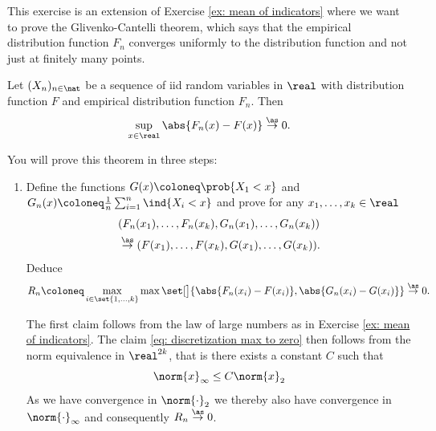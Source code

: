 \begin{exercise}
    This exercise is an extension of Exercise \ref{ex: mean of indicators} where
    we want to prove the Glivenko-Cantelli theorem, which says that the
    empirical distribution function \(F_n\) converges uniformly to the
    distribution function and not just at finitely many points.
    \begin{mdframed}[innertopmargin=0pt]
    \begin{theorem}
        \label{thm: glivenko cantelli}
        Let \((X_n)_{n\in \nat}\) be a sequence of iid random
        variables in \(\real\) with distribution function \(F\) and empirical 
        distribution function \(F_n\). Then
        \[
            \sup_{x\in \real}\abs{F_n(x) - F(x)} \overset{\as}\to 0.
        \]
    \end{theorem}
    \end{mdframed}
    You will prove this theorem in three steps:
    \begin{enumerate}[label=(\alph*),noitemsep]
        \item Define the functions \(G(x) \coloneq \prob{X_1 < x}\) and \(G_n(x) \coloneq \frac1n \sum_{i=1}^n \ind{X_i < x}\)
        and prove for any \(x_1, \dots, x_k \in \real\)
        \[\begin{aligned}
            &(F_n(x_1), \dots, F_n(x_k), G_n(x_1), \dots, G_n(x_k))
            \\
            &\overset{\as}\to (F(x_1), \dots, F(x_k), G(x_1), \dots, G(x_k)).
        \end{aligned}
        \]
        Deduce
        \begin{equation}
            \label{eq: discretization max to zero}            
            R_n \coloneq \max_{i\in \set{1,\dots, k}} \max\set[\big]{\abs{F_n(x_i) - F(x_i)}, \abs{G_n(x_i) - G(x_i)}} \overset{\as}\to 0.
        \end{equation}
        \begin{solution}
            The first claim follows from the law of large numbers as in Exercise \ref{ex: mean of indicators}.
            The claim \eqref{eq: discretization max to zero} then follows from the norm equivalence
            in \(\real^{2k}\), that is there exists a constant \(C\) such that
            \[
                \norm{x}_\infty \le C \norm{x}_2
            \]
            As we have convergence in \(\norm{\cdot}_2\) we thereby also have
            convergence in \(\norm{\cdot}_\infty\) and consequently \(R_n
            \overset{\as}\to 0\).
        \end{solution}


\end{enumerate}
\end{exercise}
